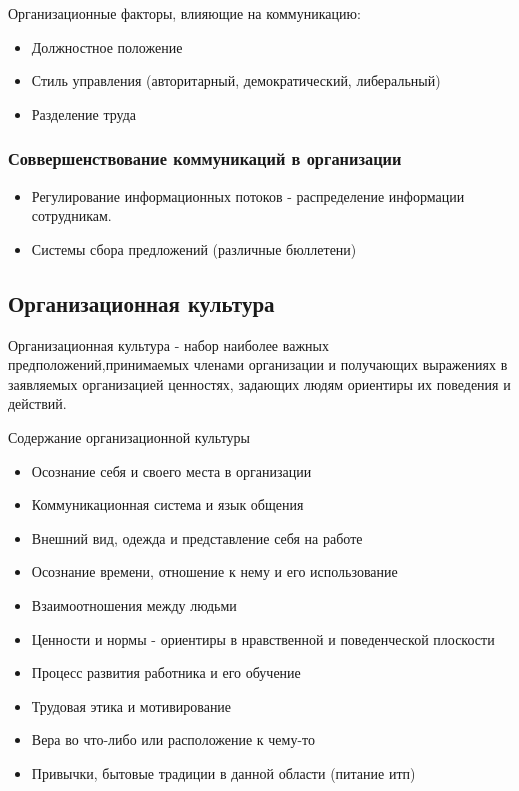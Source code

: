 \documentclass[a4paper,12pt]{report}
\begin{document}
	Организационные факторы, влияющие на коммуникацию:
	\begin{itemize}
	\item	Должностное положение
	\item	Стиль управления (авторитарный, демократический, либеральный)
	\item	Разделение труда
	\end{itemize}

	\subsubsection{Соввершенствование коммуникаций в организации}
	\begin{itemize}
	\item	Регулирование информационных потоков - распределение информации сотрудникам.
	\item	Системы сбора предложений (различные бюллетени)
	
	\end{itemize}

	\subsection{Организационная культура}
	
	Организационная культура - набор наиболее важных предположений,принимаемых членами организации и получающих
	 выражениях в заявляемых организацией ценностях, задающих людям ориентиры их поведения и действий.
	
	Содержание организационной культуры
	\begin{itemize}
	\item	Осознание себя и своего места в организации
	\item	Коммуникационная система и язык общения
	\item	Внешний вид, одежда и представление себя на работе
	\item	Осознание времени, отношение к нему и его использование
	\item	Взаимоотношения между людьми
	\item	Ценности и нормы - ориентиры в нравственной и поведенческой плоскости
	\item	Процесс развития работника и его обучение
	\item	Трудовая этика и мотивирование
	\item	Вера во что-либо или расположение к чему-то
	\item	Привычки, бытовые традиции в данной области (питание итп) 
	\end{itemize}
	
\end{document}
